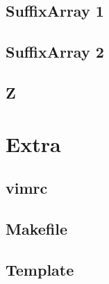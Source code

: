 \documentclass[12pt, a4paper, twoside]{article}
\begin{document}
\subsection{SuffixArray 1}


\subsection{SuffixArray 2}


\subsection{Z}




%
%

\section{Extra}

\subsection{vimrc}


\subsection{Makefile}


\subsection{Template}

\end{document}
